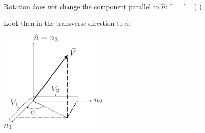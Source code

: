 \documentclass[12pt]{article}
\begin{document}
Rotation does not change the component parallel to $\hat{n}$:
\be
{}^\prime = _{\|} = ( \cdot {}) 
\ee 

Look then in the transverse direction to $\hat{n}$:
\setcounter{equation}{47}

\includegraphics[width=0.4\textwidth]{Figures/transverseRotation-crop.pdf}
\end{document}
